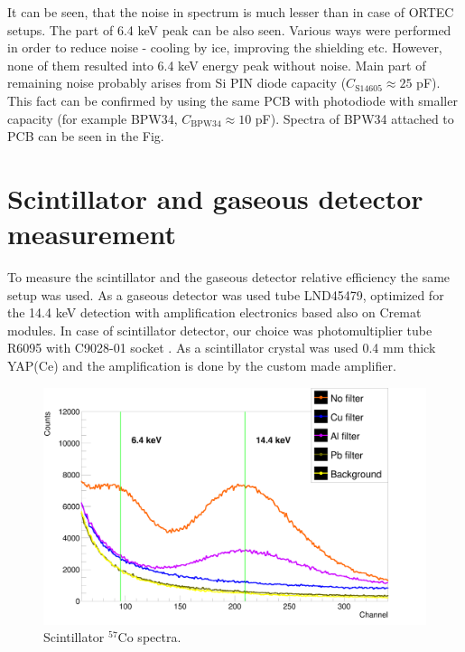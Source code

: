 It can be seen, that the noise in spectrum is much lesser than in case of ORTEC setups. The part of 6.4 keV peak can be also seen. Various ways were performed in order to reduce noise - cooling by ice, improving the shielding etc. However, none of them resulted into 6.4 keV energy peak without noise. Main part of remaining noise probably arises from Si PIN diode capacity ($C_{\textrm{S14605}} \approx 25$ pF). This fact can be confirmed by using the same PCB with photodiode with smaller capacity (for example BPW34, $C_{\textrm{BPW34}} \approx 10$ pF). Spectra of BPW34 attached to PCB can be seen in the Fig.



\section{Scintillator and gaseous detector measurement}
To measure the scintillator and the gaseous detector relative efficiency the same setup was used. As a gaseous detector was used tube LND45479, optimized for the 14.4 keV detection with amplification electronics based also on Cremat modules. In case of scintillator detector, our choice was photomultiplier tube R6095 \cite{R6095} with C9028-01 socket \cite{C9028}. As a scintillator crystal was used 0.4 mm thick YAP(Ce) and the amplification is done by the custom made amplifier\cite{STEJSKAL2019thesis}.

\begin{figure}[H]
\centering
\includegraphics[scale=0.125, angle = 0]{./pictures/PMTSpectre.png}
\caption{Scintillator $^{57}$Co spectra.}
\label{Scintillator detector spectra.}
\end{figure}

